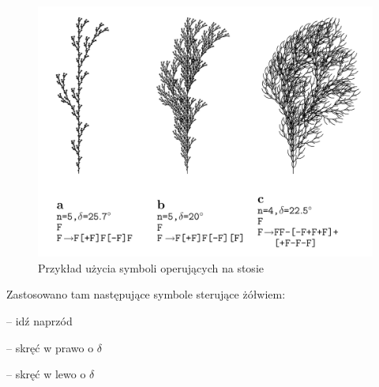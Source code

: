 \documentclass[inz,shortabstract]{iithesis}
\begin{document}
        \begin{figure}[H]
            \includegraphics[width=\linewidth]{lsystemPlants.png}
            \caption{Przykład użycia symboli operujących na stosie \cite{plants}} 
            \label{fig:lsystemPlants}
        \end{figure}
        
        Zastosowano tam następujące symbole sterujące żółwiem:
        \begin{description}[itemsep=2pt, parsep=2pt, topsep=2pt, partopsep=2pt]
            \item[\textit{F}] -- idź naprzód
            \item[+] -- skręć w prawo o $\delta$
            \item[---] -- skręć w lewo o $\delta$
        \end{description}
        
\end{document}
